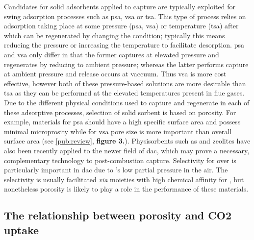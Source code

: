 Candidates for solid \glspl{adsorbent} applied to  capture are typically exploited for swing adsorption processes such as \acrfull{psa}, \acrfull{vsa} or \acrfull{tsa}. This type of process relies on \gls{adsorption} taking place at some pressure (\acrshort{psa}, \acrshort{vsa}) or temperature (\acrshort{tsa}) after which  can be regenerated by changing the condition; typically this means reducing the pressure or increasing the temperature to facilitate desorption.\citep{bahamon2018energetic, hedin2013adsorbents, Zhao2018Synthesis, adewole2013current, ho2008reducing}  \acrshort{psa} and \acrshort{vsa} only differ in that the former captures  at elevated pressure and regenerates by reducing to ambient pressure; whereas the latter performs capture at ambient pressure and release occurs at vaccuum. Thus \acrshort{vsa} is more cost effective, however both of these pressure-based solutions are more desirable than \acrshort{tsa} as they can be performed at the elevated temperatures present in flue gases.\citep{ho2008reducing, adewole2013current, Pirngruber2013} Due to the different physical conditions used to capture and regenerate  in each of these adsorptive processes, selection of solid sorbent is based on porosity. For example, materials for \acrshort{psa} should have a high specific surface area and possess minimal microprosity while for \acrshort{vsa} pore size is more important than overall surface area (see \ref{pub:review}, \textbf{figure 3.}).\citep{ho2008reducing, Chou2004, Presser2011Effect} Physisorbents such as  and zeolites have also been recently applied to the newer field of \acrfull{dac}, which may prove a necessary, complementary technology to post-combustion capture.\citep{kumar2015direct, mcqueen2021review, deutz2021life} Selectivity for  over  is particularly important in \acrshort{dac} due to 's low partial pressure in the air. The selectivity is usually facilitated \textit{via} moieties with high chemical affinity for , but nonetheless porosity is likely to play a role in the performance of these materials.\citep{kumar2015direct, darunte2016direct, deng2021comparative}

\subsection{\texorpdfstring{The relationship between porosity and CO2 uptake}{The relationship between porosity and  uptake}}


